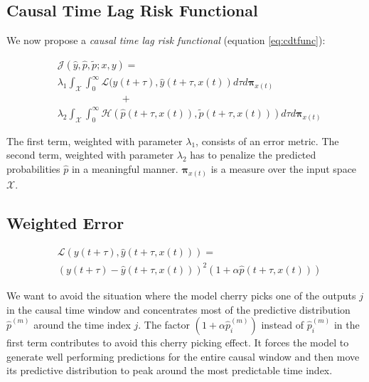 \documentclass[envcountsect,runningheads]{llncs}
\theoremstyle{etoile}
\begin{document}
\subsection{Causal Time Lag Risk Functional}

We now propose a \emph{causal time lag risk functional} 
(equation \ref{eq:cdtfunc}):

\begin{align}\label{eq:cdtfunc}
&\mathcal{J}(\hat{y}, \hat{p}, \tilde{p}; x, y) = \\
&\nonumber \lambda_1 \int_{\mathcal{X}}{
      \int_{0}^{\infty}{
            \mathcal{L}(y(t + \tau), \hat{y}(t + \tau, x(t))
      }
}d\tau d\mathbf{\pi}_{x(t)} \\ 
& \nonumber \hspace{78pt}  + \\ 
&\nonumber  \lambda_2 \int_{\mathcal{X}}{\int_{0}^{\infty}
{\mathcal{H}\left(\hat{p}(t + \tau, x(t)), \tilde{p}(t + \tau, x(t))\right)}}d\tau d\mathbf{\pi}_{x(t)}
\end{align}

The first term, weighted with parameter $\lambda_1$, consists of an 
error metric. The second term, weighted with parameter $\lambda_2$ has to 
penalize the predicted probabilities $\hat{p}$ in a meaningful manner. 
$\mathbf{\pi}_{x(t)}$ is a measure over the input space $\mathcal{X}$.


\subsection{Weighted Error}


\begin{align}\label{eq:errorfunc}
&\mathcal{L}(y(t + \tau), \hat{y}(t + \tau, x(t))) = \\ 
\nonumber &\left (y(t + \tau) - \hat{y}(t + \tau, x(t)) \right)^2 
(1 + \alpha \hat{p}(t + \tau, x(t)))
\end{align}

We want to avoid the situation where the model cherry picks one of the outputs 
$j$ in the causal time window and concentrates most of the predictive 
distribution $\hat p^{(m)}$ around the time index $j$. The factor 
$(1 + \alpha \hat p_i^{(m)})$ instead of $\hat p_i^{(m)}$ in the first term 
contributes to avoid this cherry picking effect. It forces the model to 
generate well performing predictions for the entire causal window and then 
move its predictive distribution to peak around the most predictable time index.
\end{document}
